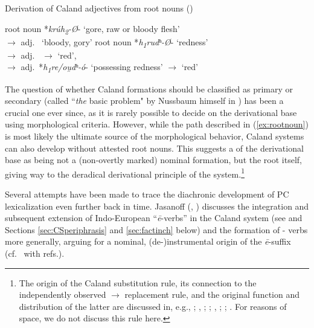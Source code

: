 \documentclass[output=paper,colorlinks,citecolor=brown]{langscibook}
\begin{document}
\begin{exe}
    \ex Derivation of Caland adjectives from root nouns (\citealt[129--130]{Rau2009}) \label{ex:rootnoun}
    \begin{xlist}
        \ex root noun *\textit{krúh\textsubscript{2}-\O}-  `gore, raw or bloody flesh' \\
        $\rightarrow$ adj.\  `bloody, gory'
        \ex root noun *\textit{h\textsubscript{1}rudʰ-\O}-  `redness'\\
        $\rightarrow$ adj.\  $\rightarrow$ `red',\\
        $\rightarrow$ adj.\ *\textit{h\textsubscript{1}re/ou̯dʰ-ó}- `possessing redness' $\rightarrow$ `red'  
     \end{xlist}
\end{exe}

The question of whether Caland formations   should be classified as primary  or secondary (called ``\emph{the} basic problem" by Nussbaum himself in \citeyear[101]{Nussbaum1976}) has been a crucial one ever since, as it is rarely possible to decide on the derivational base using morphological criteria. However, while the path described in (\ref{ex:rootnoun}) is most likely the ultimate source of the morphological behavior, Caland systems  can also develop without attested root nouns. This suggests a  of the derivational base as being not a (non-overtly marked) nominal formation, but the root itself, giving way to the deradical derivational principle of the system.\footnote{The origin of the Caland substitution rule,  its connection to the independently observed  $\rightarrow$  replacement rule, and the original function and distribution of the latter are discussed in, e.g., \citealt{Schindler1980}; \citealt{Nussbaum1999}, \citeyear{Nussbaum2022}; \citealt{Rasmussen2002}; \citealt[269--287]{Balles2006}, \citeyear{Balles2009}; \citealt{Pinault2018};  \citealt{Grestenberger2021}. For reasons of space, we do not discuss this rule here.}

Several attempts have been made to trace the diachronic development of PC lexicalization even further back in time. Jasanoff (\citeyear{Jasanoff1978}, \citeyear{Jasanoff2004}) discusses the integration and subsequent extension of Indo-European ``\textit{ē}-verbs'' in the Caland system  (see  and Sections \ref{sec:CSperiphrasis} and \ref{sec:factinch} below) and the formation of - verbs more generally, arguing for a nominal, (de-)instrumental origin of the \textit{ē}-suffix (cf.\ \citealt{Grestenberger2023} with refs.). 
\end{document}
